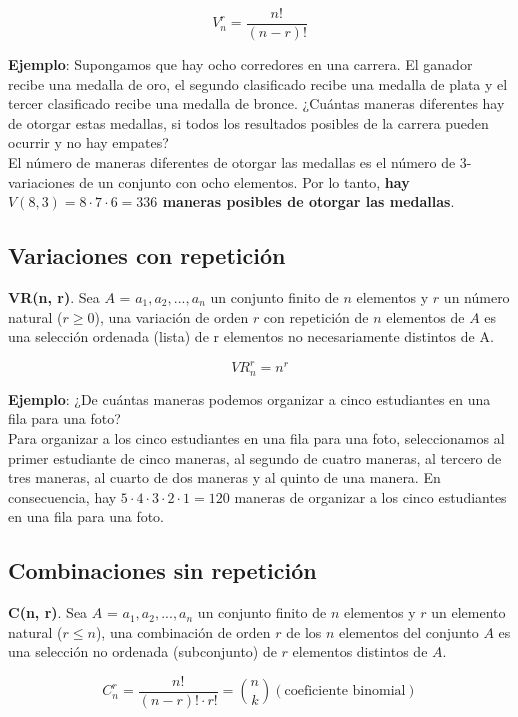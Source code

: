 \documentclass{article}
\begin{document}
 $$V_n^r = \frac{n!}{(n-r)!}$$
 
\textbf{Ejemplo}: Supongamos que hay ocho corredores en una carrera. El ganador recibe una medalla de oro, el segundo clasificado recibe una medalla de plata y el tercer clasificado recibe una medalla de bronce. ¿Cuántas maneras diferentes hay de otorgar estas medallas, si todos los resultados posibles de la carrera pueden ocurrir y no hay empates? \\

El número de maneras diferentes de otorgar las medallas es el número de 3-variaciones de un conjunto con ocho elementos. Por lo tanto, \textbf{hay $V(8, 3) = 8 \cdot 7 \cdot 6 = 336$ maneras posibles de otorgar las medallas}. \\

\subsection{Variaciones con repetición}
\textbf{VR(n, r)}. Sea $A$ = {$a_1, a_2, ..., a_n$} un conjunto finito de $n$ elementos y $r$ un número natural ($r \geq 0$), una variación de orden $r$ con repetición de $n$ elementos de $A$ es una selección ordenada (lista) de r elementos no necesariamente distintos de A.

$$VR_n^r = n^r$$

\textbf{Ejemplo}: ¿De cuántas maneras podemos organizar a cinco estudiantes en una fila para una foto? \\

Para organizar a los cinco estudiantes en una fila para una foto, seleccionamos al primer estudiante de cinco maneras, al segundo de cuatro maneras, al tercero de tres maneras, al cuarto de dos maneras y al quinto de una manera. En consecuencia, hay $5 \cdot 4 \cdot 3 \cdot 2 \cdot 1 = 120$ maneras de organizar a los cinco estudiantes en una fila para una foto.

\newpage

\subsection{Combinaciones sin repetición}
\textbf{C(n, r)}. Sea $A$ = {$a_1, a_2, ..., a_n$} un conjunto finito de $n$ elementos y $r$ un elemento natural ($r \leq n$), una combinación de orden $r$ de los $n$ elementos del conjunto $A$ es una selección no ordenada (subconjunto) de $r$ elementos distintos de $A$.

$$C_n^r = \frac{n!}{(n-r)! \cdot r!} = \binom{n}{k} (\text{coeficiente binomial})$$
\end{document}

